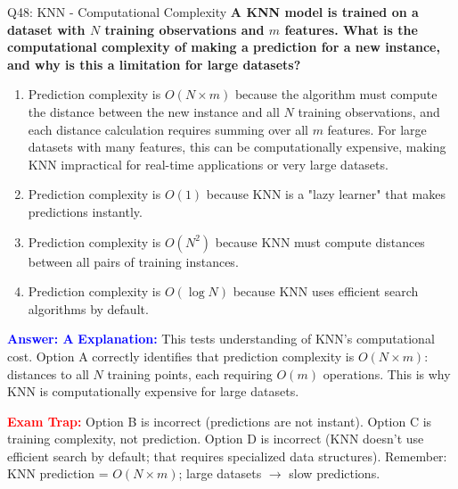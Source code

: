 \documentclass[8pt]{beamer}
\begin{document}
	\begin{frame}{Q48: KNN - Computational Complexity}
		\fontsize{6.5}{7.5}\selectfont
		\textbf{A KNN model is trained on a dataset with $N$ training observations and $m$ features. What is the computational complexity of making a prediction for a new instance, and why is this a limitation for large datasets?}
		
		\begin{enumerate}
			\item Prediction complexity is $O(N \times m)$ because the algorithm must compute the distance between the new instance and all $N$ training observations, and each distance calculation requires summing over all $m$ features. For large datasets with many features, this can be computationally expensive, making KNN impractical for real-time applications or very large datasets.
			\item Prediction complexity is $O(1)$ because KNN is a "lazy learner" that makes predictions instantly.
			\item Prediction complexity is $O(N^2)$ because KNN must compute distances between all pairs of training instances.
			\item Prediction complexity is $O(\log N)$ because KNN uses efficient search algorithms by default.
		\end{enumerate}
		
		\vspace{0.1cm}
		\textcolor{blue}{\textbf{Answer: A}}
		\vspace{0.1cm}
		\textcolor{blue}{\textbf{Explanation:}} This tests understanding of KNN's computational cost. Option A correctly identifies that prediction complexity is $O(N \times m)$: distances to all $N$ training points, each requiring $O(m)$ operations. This is why KNN is computationally expensive for large datasets.
		
		\textcolor{red}{\textbf{Exam Trap:}} Option B is incorrect (predictions are not instant). Option C is training complexity, not prediction. Option D is incorrect (KNN doesn't use efficient search by default; that requires specialized data structures). Remember: KNN prediction = $O(N \times m)$; large datasets $\rightarrow$ slow predictions.
	\end{frame}
	
\end{document}
